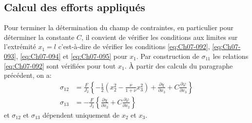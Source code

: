 \subsection{Calcul des efforts appliqués} \label{ssec:Ch07-3.2}
Pour terminer la détermination du champ de contraintes, en particulier pour déterminer la constante $C$, il convient de vérifier les conditions aux limites sur l'extrémité $x_1 = l$ c'est-à-dire de vérifier les conditions \eqref{eq:Ch07-092}, \eqref{eq:Ch07-093}, \eqref{eq:Ch07-094} et \eqref{eq:Ch07-095} pour $x_1$.
Par construction de $\sigma_{11}$ les relations \eqref{eq:Ch07-092} sont 
vérifiées pour tout $x_1$.
\`A partir des calculs du paragraphe précédent, on a:
\begin{equation}
    \begin{aligned}
        \sigma_{12} &= \frac{F}{J_2} \left\{ -\frac{1}{2} \left( x_2^2 - \frac{\nu}{1+\nu} x_3^2 \right) + \frac{\partial \chi}{\partial x_3} + C \frac{\partial \varphi}{\partial x_3} \right\} \\
        \sigma_{13} &= - \frac{F}{J_2} \left\{ \frac{\partial \chi}{\partial x_2} + C \frac{\partial \varphi}{\partial x_2} \right\}
    \end{aligned}
    \label{eq:Ch07-109}
\end{equation}
et $\sigma_{12}$ et $\sigma_{13}$ dépendent uniquement de $x_2$ et $x_3$.

